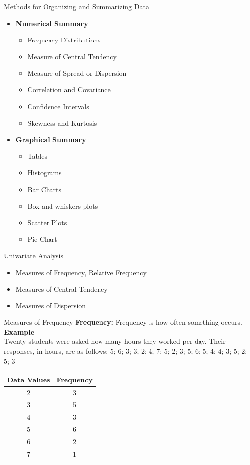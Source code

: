 \documentclass[10pt,dvipsnames, aspectratio=169]{beamer}
\begin{document}
\begin{frame}[t]{Methods for Organizing and Summarizing Data}
	\begin{itemize}
		\item \textbf{Numerical Summary}
		\begin{itemize}
			\item Frequency Distributions
			\item Measure of Central Tendency
			\item Measure of Spread or Dispersion
			\item Correlation and Covariance
			\item Confidence Intervals
			\item Skewness and Kurtosis 
		\end{itemize}
	\end{itemize}
	
	\begin{itemize}
		\item \textbf{Graphical Summary}
		\begin{itemize}
			\item Tables
			\item Histograms
			\item Bar Charts
			\item Box-and-whiskers plots
			\item Scatter Plots
			\item Pie Chart 
		\end{itemize}
	\end{itemize}
\end{frame}
\begin{frame}[t]{Univariate Analysis}
	\begin{itemize}
		\item Measures of Frequency, Relative Frequency 
		\item Measures of Central Tendency
		\item Measures of Dispersion
	\end{itemize}
\end{frame}
\begin{frame}[t]{Measures of Frequency}
	\textbf{Frequency:} Frequency is how often something occurs. \\ 
	\textbf{Example} \\ 
	Twenty students were asked how many hours they worked per day.
	Their responses, in hours,
	are as follows: 5; 6; 3; 3; 2; 4; 7; 5; 2; 3; 5; 6; 5; 4; 4; 3; 5; 2; 
	5; 3
	\begin{center}
		\begin{tabular}{|c|c|} 
			\hline 
			Data Values & Frequency \\ 
			\hline 
			2 & 3 \\ 
			\hline 
			3 & 5 \\
			\hline  
			4 & 3 \\
			\hline  
			5 & 6 \\
			\hline  
			6 & 2 \\
			\hline 
			7 & 1 \\
			\hline 
		\end{tabular}
	\end{center}
\end{frame}
\end{document}
